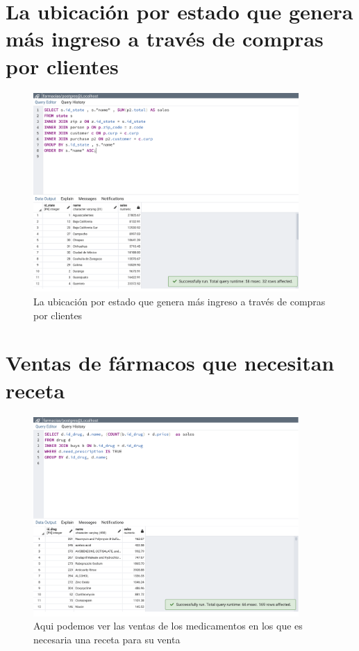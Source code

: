 \documentclass[12pt, fleqn]{report}                             %
\theoremstyle{break}                                            %
\begin{document}
        \clearpage
        \section{La ubicación por estado que genera más ingreso a través de compras por clientes}
            
            \begin{figure}[ht]
                \includegraphics[width=0.9\textwidth]{14}
                \caption{La ubicación por estado que genera más ingreso a través de compras por clientes
                }
            \end{figure}  


        \clearpage
        \section{Ventas de fármacos que necesitan receta}
            
            \begin{figure}[ht]
                \includegraphics[width=0.9\textwidth]{15}
                \caption{Aqui podemos ver las ventas de los medicamentos en los que es necesaria una receta para
                su venta
                }
            \end{figure}  
\end{document}
